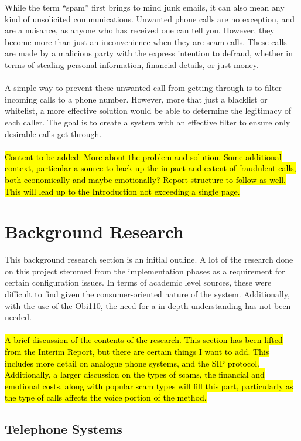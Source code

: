 \documentclass[12pt,a4paper]{report}
\begin{document}
While the term ``spam'' first brings to mind junk emails, it can also mean any kind of unsolicited communications. Unwanted phone calls are no exception, and are a nuisance, as anyone who has received one can tell you. However, they become more than just an inconvenience when they are scam calls. These calls are made by a malicious party with the express intention to defraud, whether in terms of stealing personal information, financial details, or just money.
\\\\
A simple way to prevent these unwanted call from getting through is to filter incoming calls to a phone number. However, more that just a blacklist or whitelist, a more effective solution would be able to determine the legitimacy of each caller. The goal is to create a system with an effective filter to ensure only desirable calls get through.
\\\\
\hl{Content to be added: More about the problem and solution. Some additional context, particular a source to back up the impact and extent of fraudulent calls, both economically and maybe emotionally? Report structure to follow as well. This will lead up to the Introduction not exceeding a single page.}

\chapter{Background Research}

This background research section is an initial outline. A lot of the research done on this project stemmed from the implementation phases as a requirement for certain configuration issues. In terms of academic level sources, these were difficult to find given the consumer-oriented nature of the system. Additionally, with the use of the Obi110, the need for a in-depth understanding has not been needed.
\\\\
\hl{A brief discussion of the contents of the research. This section has been lifted from the Interim Report, but there are certain things I want to add. This includes more detail on analogue phone systems, and the SIP protocol. Additionally, a larger discussion on the types of scams, the financial and emotional costs, along with popular scam types will fill this part, particularly as the type of calls affects the voice portion of the method.}

\section{Telephone Systems}
\end{document}
